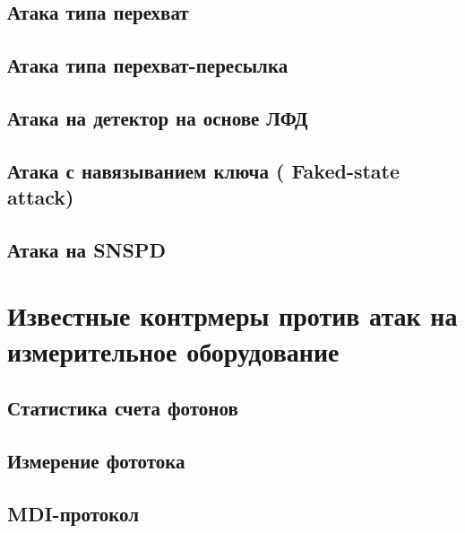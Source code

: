 \subsection{Атака типа перехват} \label{subsec:ch1/sec6/sub2}


\subsection{Атака типа перехват-пересылка} \label{subsec:ch1/sec6/sub3}


\subsection{Атака на детектор на основе ЛФД} \label{subsec:ch1/sec6/sub4}


\subsection{Атака с навязыванием ключа ( Faked-state attack)} \label{subsec:ch1/sec6/sub5}


\subsection{Атака на SNSPD} \label{subsec:ch1/sec6/sub6}



\section{Известные контрмеры против атак на измерительное оборудование} \label{sec:ch1/sec7}


\subsection{Статистика счета фотонов} \label{subsec:ch1/sec7/sub1}

\subsection{Измерение фототока} \label{subsec:ch1/sec7/sub2}

\subsection{MDI-протокол} \label{subsec:ch1/sec7/sub3}

